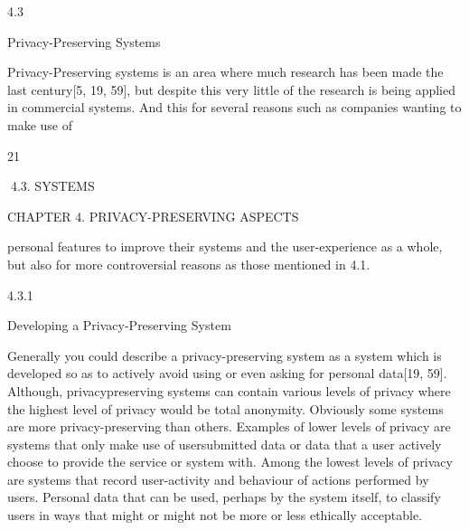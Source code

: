 4.3

Privacy-Preserving Systems

Privacy-Preserving systems is an area where much research has been made the last
century[5, 19, 59], but despite this very little of the research is being applied in commercial systems. And this for several reasons such as companies wanting to make use of

21

4.3. SYSTEMS

CHAPTER 4. PRIVACY-PRESERVING ASPECTS

personal features to improve their systems and the user-experience as a whole, but also
for more controversial reasons as those mentioned in 4.1.

4.3.1

Developing a Privacy-Preserving System

Generally you could describe a privacy-preserving system as a system which is developed
so as to actively avoid using or even asking for personal data[19, 59]. Although, privacypreserving systems can contain various levels of privacy where the highest level of privacy
would be total anonymity. Obviously some systems are more privacy-preserving than
others. Examples of lower levels of privacy are systems that only make use of usersubmitted data or data that a user actively choose to provide the service or system
with. Among the lowest levels of privacy are systems that record user-activity and behaviour of actions performed by users. Personal data that can be used, perhaps by
the system itself, to classify users in ways that might or might not be more or less
ethically acceptable.
